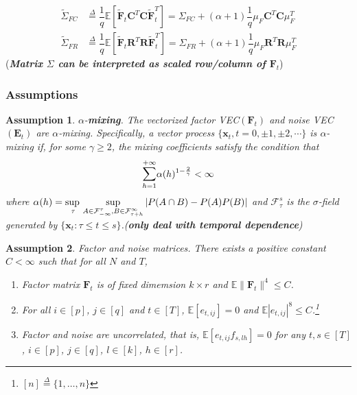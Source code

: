 \documentclass{article}[12pt]
\newtheorem{assumption}{Assumption}
\begin{document}
\begin{enumerate}
    \begin{equation} 
       \begin{split}
           \widetilde{\Sigma}_{FC} &\overset{\Delta}{=} \dfrac{1}{q}\mathbb{E}\left[\mathbf{\widetilde{F}}_t\mathbf{C}^T\mathbf{C}\mathbf{\widetilde{F}}_t^T\right] =   \Sigma_{FC} + (\alpha + 1)\dfrac{1}{q}\mu_F\mathbf{C}^T\mathbf{C}\mu_F^T \\
           \widetilde{\Sigma}_{FR} & \overset{\Delta}{=} \dfrac{1}{q}\mathbb{E}\left[\mathbf{\widetilde{F}}_t\mathbf{R}^T\mathbf{R}\mathbf{\widetilde{F}}_t^T\right] =   \Sigma_{FR} + (\alpha + 1)\dfrac{1}{q}\mu_F\mathbf{R}^T\mathbf{R}\mu_F^T 
       \end{split}
    \end{equation}
    \noindent (\textbf{\textit{Matrix $\Sigma$ can be interpreted as scaled row/column of $\mathbf{F}_t$}})
\end{enumerate}

\subsubsection{Assumptions}

\begin{assumption}\label{assumption 1 1.7.1}
    $\alpha$-\textbf{mixing}. \normalfont The vectorized factor VEC$(\mathbf{F}_t)$ and noise VEC$(\mathbf{E}_t)$ are $\alpha$-mixing. Specifically, a vector process $\{\mathbf{x}_t, t=0, \pm 1,\pm 2,\cdots\}$ is $\alpha$-mixing if, for some $\gamma \geq 2$, the mixing coefficients satisfy the condition that
    $$\mathlarger{\sum}_{h=1}^{+\infty} \alpha(h)^{1-\frac{2}{\gamma}} < \infty$$
    where $\alpha(h) =  \adjustlimits\sup_{\tau}\sup_{A \in \mathcal{F}_{-\infty}^{\tau}, B \in \mathcal{F}_{\tau + h}^{\infty}}|P(A\cap B)-P(A)P(B)|$ and $\mathcal{F}_{\tau}^s$ is the $\sigma$-field generated by $\{\mathbf{x}_t:\tau \leq t \leq s\}$.(\textbf{\textit{only deal with temporal dependence}})
\end{assumption}
 
\begin{assumption}\label{assumption 2 1.7.1}
    Factor and noise matrices. \normalfont There exists a positive constant $C < \infty$ such that for all $N$ and $T$,
    \begin{enumerate}
        \item Factor matrix $\mathbf{F}_t$ is of fixed dimemsion $k \times r$ and $\mathbb{E}\lVert\mathbf{F}_t\rVert^4\leq C $.
        \item For all $i \in \left[p\right]$, $j \in \left[q\right]$ and $t \in \left[T\right]$, $\mathbb{E}\left[e_{t,ij}\right]=0$ and $\mathbb{E}|e_{t,ij}|^8 \leq C$.\footnote{$\left[n\right] \overset{\Delta}{=} \{1,\dots,n\}$}
        \item Factor and noise are uncorrelated, that is, $\mathbb{E}\left[e_{t,ij}f_{s,lh}\right]=0$ for any $t,s \in \left[T\right]$, $i \in \left[p\right]$, $j \in \left[q\right]$, $l \in \left[k\right]$, $h \in \left[r\right]$.
    \end{enumerate}
\end{assumption}
\end{document}
